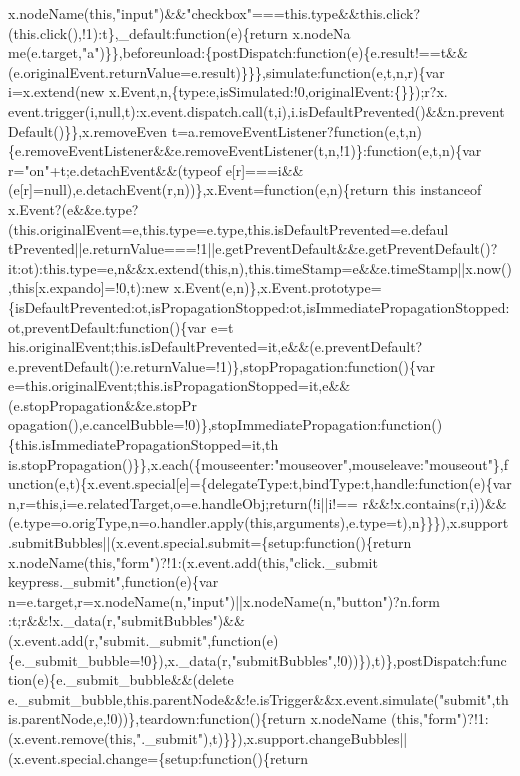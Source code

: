 \begin{DoxyCode}
{       x.nodeName(this,"input")&&"checkbox"===this.type&&this.click?(this.click(),!1):t\},\_default:function(e)\{return
       x.nodeNa
      me(e.target,"a")\}\},beforeunload:\{postDispatch:function(e)\{e.result!==t&&(e.originalEvent.returnValue=e.result)\}\}\},simulate:function(e,t,n,r)\{var i=x.extend(new
       x.Event,n,\{type:e,isSimulated:!0,originalEvent:\{\}\});r?x.
      event.trigger(i,null,t):x.event.dispatch.call(t,i),i.isDefaultPrevented()&&n.preventDefault()\}\},x.removeEven
      t=a.removeEventListener?function(e,t,n)\{e.removeEventListener&&e.removeEventListener(t,n,!1)\}:function(e,t,n)\{var r="on"+t;e.detachEvent&&(typeof
       e[r]===i&&(e[r]=null),e.detachEvent(r,n))\},x.Event=function(e,n)\{return this instanceof
       x.Event?(e&&e.type?(this.originalEvent=e,this.type=e.type,this.isDefaultPrevented=e.defaul
      tPrevented||e.returnValue===!1||e.getPreventDefault&&e.getPreventDefault()?it:ot):this.type=e,n&&x.extend(this,n),this.timeStamp=e&&e.timeStamp||x.now(),this[x.expando]=!0,t):new
       x.Event(e,n)\},x.Event.prototype=\{isDefaultPrevented:ot,isPropagationStopped:ot,isImmediatePropagationStopped:ot,preventDefault:function()\{var
       e=t
      his.originalEvent;this.isDefaultPrevented=it,e&&(e.preventDefault?e.preventDefault():e.returnValue=!1)\},stopPropagation:function()\{var
       e=this.originalEvent;this.isPropagationStopped=it,e&&(e.stopPropagation&&e.stopPr
      opagation(),e.cancelBubble=!0)\},stopImmediatePropagation:function()\{this.isImmediatePropagationStopped=it,th
      is.stopPropagation()\}\},x.each(\{mouseenter:"mouseover",mouseleave:"mouseout"\},function(e,t)\{x.event.special[e]=\{delegateType:t,bindType:t,handle:function(e)\{var
       n,r=this,i=e.relatedTarget,o=e.handleObj;return(!i||i!==
      r&&!x.contains(r,i))&&(e.type=o.origType,n=o.handler.apply(this,arguments),e.type=t),n\}\}\}),x.support.submitBubbles||(x.event.special.submit=\{setup:function()\{return
       x.nodeName(this,"form")?!1:(x.event.add(this,"click.\_submit keypress.\_submit",function(e)\{var
       n=e.target,r=x.nodeName(n,"input")||x.nodeName(n,"button")?n.form
      :t;r&&!x.\_data(r,"submitBubbles")&&(x.event.add(r,"submit.\_submit",function(e)\{e.\_submit\_bubble=!0\}),x.\_data(r,"submitBubbles",!0))\}),t)\},postDispatch:function(e)\{e.\_submit\_bubble&&(delete
       e.\_submit\_bubble,this.parentNode&&!e.isTrigger&&x.event.simulate("submit",this.parentNode,e,!0))\},teardown:function()\{return
       x.nodeName
      (this,"form")?!1:(x.event.remove(this,".\_submit"),t)\}\}),x.support.changeBubbles||(x.event.special.change=\{setup:function()\{return
}
\end{DoxyCode}
